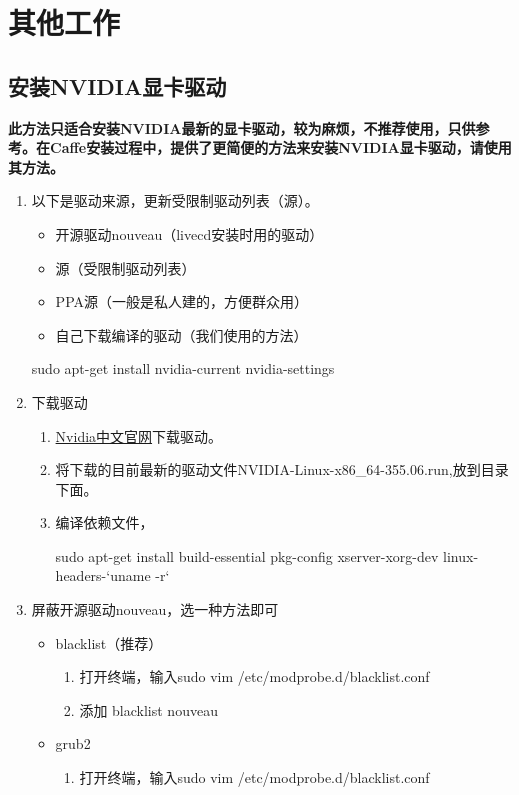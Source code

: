 \section{其他工作}
\subsection{安装NVIDIA显卡驱动}
\textbf{此方法只适合安装NVIDIA最新的显卡驱动，较为麻烦，不推荐使用，只供参考。在Caffe安装过程中，提供了更简便的方法来安装NVIDIA显卡驱动，请使用其方法。}
\begin{enumerate}
\item 以下是驱动来源，更新受限制驱动列表（源）。
\begin{itemize}
\item 开源驱动nouveau（livecd安装时用的驱动）
\item 源（受限制驱动列表）
\item PPA源（一般是私人建的，方便群众用）
\item 自己下载编译的驱动（我们使用的方法）
\end{itemize}
\begin{bash}
sudo apt-get install nvidia-current nvidia-settings
\end{bash}
\item 下载驱动
	\begin{enumerate}
	\item \href{http://www.nvidia.cn/page/home.html}{Nvidia中文官网}下载驱动。
	\item 将下载的目前最新的驱动文件NVIDIA-Linux-x86\_64-355.06.run,放到{\color{blue}{/home/用户名/}}目录下面。
	\item 编译依赖文件，
	\begin{bash}
	sudo apt-get install build-essential pkg-config xserver-xorg-dev linux-headers-`uname -r`
	\end{bash}
	\end{enumerate}
\item 屏蔽开源驱动nouveau，选一种方法即可
	\begin{itemize}
	\item blacklist（推荐）
	    \begin{enumerate}
	    \item 打开终端，输入sudo vim /etc/modprobe.d/blacklist.conf
	    \item 添加 blacklist nouveau
	    \end{enumerate}
	\item grub2
	    \begin{enumerate}
	    \item 打开终端，输入sudo vim /etc/modprobe.d/blacklist.conf

\end{enumerate}
\end{itemize}
\end{enumerate}
